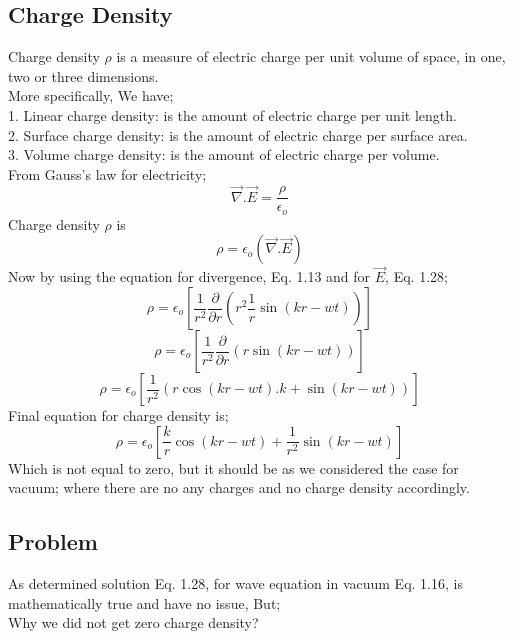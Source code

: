 \subsection{Charge Density}
Charge density $\rho$ is a measure of electric charge per unit volume of space, in one, two or three dimensions.\\
More specifically, We have;\\
1. Linear charge density: is the amount of electric charge per unit length.\\
2. Surface charge density: is the amount of electric charge per surface area.\\
3. Volume charge density: is the amount of electric charge per volume.\\
From Gauss's law for electricity;\\
\begin{equation}
\vec{\nabla}.\vec{E} = \frac{\rho}{\epsilon_{o}}
\end{equation}
Charge density $\rho$ is\\
\begin{equation}
\rho = {\epsilon_{o}}(\vec{\nabla}.\vec{E})
\end{equation}
Now by using the equation for divergence, Eq. 1.13 and for $\vec{E}$, Eq. 1.28;\\
\begin{equation}
\rho = {\epsilon_{o}}[\frac{1}{r^2}\frac{\partial}{\partial r}(r^2\frac{1}{r}\sin(kr-wt))]
\end{equation}
\begin{equation}
\rho = {\epsilon_{o}}[\frac{1}{r^2}\frac{\partial}{\partial r}(r\sin(kr-wt))]
\end{equation}
\begin{equation}
\rho = {\epsilon_{o}}[\frac{1}{r^2}(r\cos(kr-wt).k+\sin(kr-wt))]
\end{equation}
Final equation for charge density is;\\
\begin{equation}
\rho = {\epsilon_{o}}[\frac{k}{r}\cos(kr-wt)+\frac{1}{r^2}\sin(kr-wt)]
\end{equation}
Which is not equal to zero, but it should be as we considered the case for vacuum; where there are no any charges and no charge density accordingly.\\

\subsection{Problem}
As determined solution Eq. 1.28, for wave equation in vacuum Eq. 1.16, is mathematically true and have no issue, But;\\
Why we did not get zero charge density?

